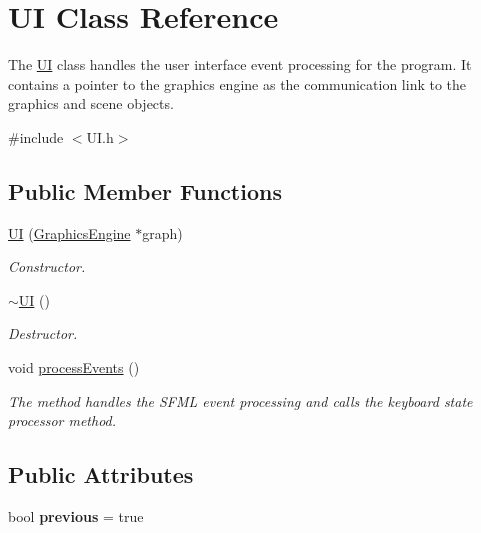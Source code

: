 \hypertarget{class_u_i}{}\section{UI Class Reference}
\label{class_u_i}


The \hyperlink{class_u_i}{UI} class handles the user interface event processing for the program. It contains a pointer to the graphics engine as the communication link to the graphics and scene objects.  




{\ttfamily \#include $<$U\+I.\+h$>$}

\subsection*{Public Member Functions}
\begin{DoxyCompactItemize}
\item 
\hyperlink{class_u_i_a9c605272304cb2d5efff79edb32e9241}{UI} (\hyperlink{class_graphics_engine}{Graphics\+Engine} $\ast$graph)
\begin{DoxyCompactList}\small\item\em Constructor. \end{DoxyCompactList}\item 
\hyperlink{class_u_i_a1b23d0c64c7cbb3d143d90ec532a7ccd}{$\sim$\+UI} ()
\begin{DoxyCompactList}\small\item\em Destructor. \end{DoxyCompactList}\item 
void \hyperlink{class_u_i_a440e133dbf19d82b8b40809644494068}{process\+Events} ()
\begin{DoxyCompactList}\small\item\em The method handles the S\+F\+ML event processing and calls the keyboard state processor method. \end{DoxyCompactList}\end{DoxyCompactItemize}
\subsection*{Public Attributes}
\begin{DoxyCompactItemize}
\item 
\mbox{\label{class_u_i_ac6772add04f60f35846a8549b3bbf5e0}} 
bool {\bfseries previous} = true
\end{DoxyCompactItemize}


